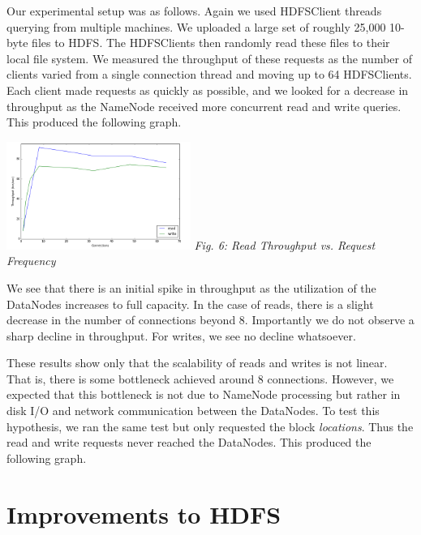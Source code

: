 \documentclass[11pt, a4paper]{article}
\begin{document}
\begin{multicols*}{2}
Our experimental setup was as follows. Again we used HDFSClient threads querying from multiple machines. We uploaded a large set of roughly 25,000 10-byte files to HDFS. The HDFSClients then randomly read these files to their local file system. We measured the throughput of these requests as the number of clients varied from a single connection thread and moving up to 64 HDFSClients. Each client made requests as quickly as possible, and we looked for a decrease in throughput as the NameNode received more concurrent read and write queries. This produced the following graph.
\begin{center}
	\includegraphics[keepaspectratio=true, width=0.45\textwidth]{ConcurrencyResults}	
	\textit{Fig. 6: Read Throughput vs. Request Frequency}
\end{center}
We see that there is an initial spike in throughput as the utilization of the DataNodes increases to full capacity. In the case of reads, there is a slight decrease in the number of connections beyond 8. Importantly we do not observe a sharp decline in throughput. For writes, we see no decline whatsoever.

These results show only that the scalability of reads and writes is not linear. That is, there is some bottleneck achieved around 8 connections. However, we expected that this bottleneck is not due to NameNode processing but rather in disk I/O and network communication between the DataNodes. To test this hypothesis, we ran the same test but only requested the block \textit{locations}. Thus the read and write requests never reached the DataNodes. This produced the following graph.

\section{Improvements to HDFS}\label{Improvements}


\end{multicols*}
\end{document}
